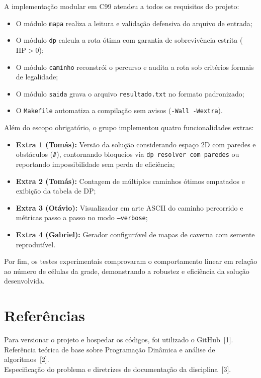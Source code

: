 \documentclass[12pt,a4paper]{article}
\makeatletter
\DeclareRobustCommand{\_}{%
  \ifmmode
    \nfss@text{\textunderscore}%
  \else
    \textunderscore\allowbreak
  \fi
}
\makeatother
\begin{document}
A implementação modular em C99 atendeu a todos os requisitos do projeto:
\begin{itemize}
    \item O módulo \texttt{mapa} realiza a leitura e validação defensiva do arquivo de entrada;
    \item O módulo \texttt{dp} calcula a rota ótima com garantia de sobrevivência estrita ($\text{HP} > 0$);
    \item O módulo \texttt{caminho} reconstrói o percurso e audita a rota sob critérios formais de legalidade;
    \item O módulo \texttt{saida} grava o arquivo \texttt{resultado.txt} no formato padronizado;
    \item O \texttt{Makefile} automatiza a compilação sem avisos (\texttt{-Wall -Wextra}).
\end{itemize}

Além do escopo obrigatório, o grupo implementou quatro funcionalidades extras:
\begin{itemize}
    \item \textbf{Extra 1 (Tomás):} Versão da solução considerando espaço 2D com paredes e obstáculos (\texttt{\#}), contornando bloqueios via \texttt{dp\_resolver\_com\_paredes} ou reportando impossibilidade sem perda de eficiência;
    \item \textbf{Extra 2 (Tomás):} Contagem de múltiplos caminhos ótimos empatados e exibição da tabela de DP;
    \item \textbf{Extra 3 (Otávio):} Visualizador em arte ASCII do caminho percorrido e métricas passo a passo no modo \texttt{--verbose};
    \item \textbf{Extra 4 (Gabriel):} Gerador configurável de mapas de caverna com semente reprodutível.
\end{itemize}

Por fim, os testes experimentais comprovaram o comportamento linear em relação ao número de células da grade, demonstrando a robustez e eficiência da solução desenvolvida.


\section{Refer\^{e}ncias}

Para versionar o projeto e hospedar os c\'{o}digos, foi utilizado o GitHub~[1].\\
Refer\^{e}ncia te\'{o}rica de base sobre Programa\c{c}\~{a}o Din\^{a}mica e an\'{a}lise de algoritmos~[2].\\
Especifica\c{c}\~{a}o do problema e diretrizes de documenta\c{c}\~{a}o da disciplina~[3].\\[0.6cm]
\end{document}
